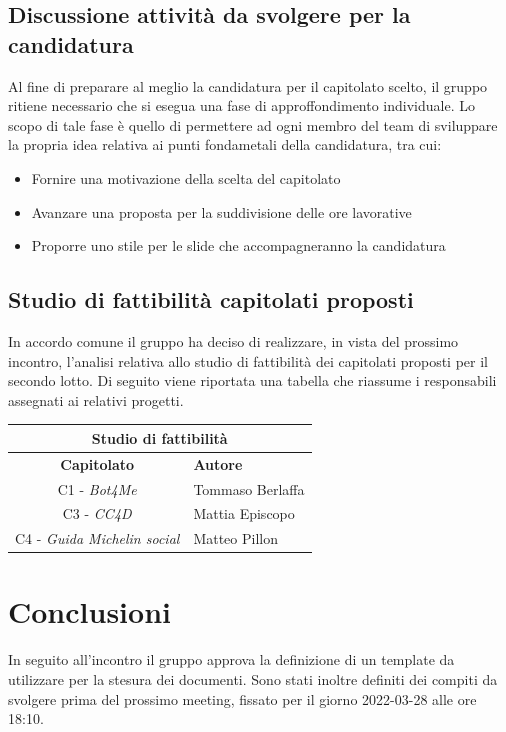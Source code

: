 \documentclass[12pt, a4paper,table]{article}
\begin{document}
		 \subsection {Discussione attività da svolgere per la candidatura}
		Al fine di preparare al meglio la candidatura per il capitolato scelto, il gruppo ritiene necessario che si esegua una fase di approffondimento individuale. Lo scopo di tale fase è quello di permettere ad ogni membro del team di sviluppare la propria idea relativa ai punti fondametali della candidatura, tra cui:
		\begin{itemize}
			\item Fornire una motivazione della scelta del capitolato
			\item Avanzare una proposta per la suddivisione delle ore lavorative
			\item Proporre uno stile per le slide che accompagneranno la candidatura
		\end{itemize}

		\newpage
		 \subsection {Studio di fattibilità capitolati proposti}
		In accordo comune il gruppo ha deciso di realizzare, in vista del prossimo incontro, l'analisi relativa allo studio di fattibilità dei capitolati proposti per il secondo lotto. Di seguito viene riportata una tabella che riassume i responsabili assegnati ai relativi progetti.  
		\vspace{1em} 
		
		 \renewcommand{\arraystretch}{1.8} %
		 \begin{center}
		 \begin{tabular}{ |c|l| }
			\hline \multicolumn{2}{|c|}{\textbf{Studio di fattibilità }} \\
			\hline
			\textbf{Capitolato} & \textbf{Autore} \\
			\hline
			C1 - \textit{Bot4Me} & Tommaso Berlaffa\\
			\hline
			C3 - \textit{CC4D} & Mattia Episcopo\\
			\hline
			C4 - \textit{Guida Michelin social }& Matteo Pillon\\
			\hline
		 \end{tabular}
		\end{center}
	
		 \section{Conclusioni}
	     In seguito all'incontro il gruppo approva la definizione di un template da utilizzare per la stesura dei documenti. Sono stati inoltre definiti dei compiti da svolgere prima del prossimo meeting, fissato per il giorno 2022-03-28 alle ore 18:10. 
	\newpage
	
\end{document}
